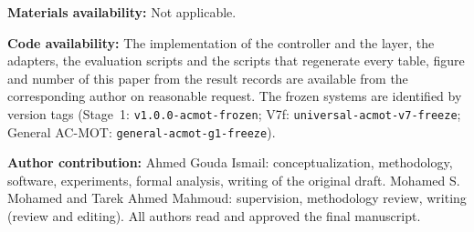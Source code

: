 \documentclass[pdflatex,sn-mathphys-num]{sn-jnl}
\begin{document}
\noindent\textbf{Materials availability:} Not applicable.

\noindent\textbf{Code availability:} The implementation of the controller and the layer, the adapters, the evaluation scripts and the scripts that regenerate every table, figure and number of this paper from the result records are available from the corresponding author on reasonable request. The frozen systems are identified by version tags (Stage~1: \texttt{v1.0.0-acmot-frozen}; V7f: \texttt{universal-acmot-v7-freeze}; General AC-MOT: \texttt{general-acmot-g1-freeze}).

\noindent\textbf{Author contribution:} Ahmed Gouda Ismail: conceptualization, methodology, software, experiments, formal analysis, writing of the original draft. Mohamed S. Mohamed and Tarek Ahmed Mahmoud: supervision, methodology review, writing (review and editing). All authors read and approved the final manuscript.


\end{document}
